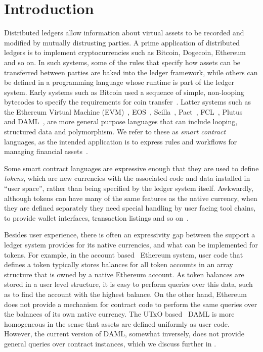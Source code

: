 
\section{Introduction}
Distributed ledgers allow information about virtual assets to be recorded and modified by mutually distrusting parties. A prime application of distributed ledgers is to implement cryptocurrencies such as Bitcoin, Dogecoin, Ethereum and so on. In such systems, some of the rules that specify how assets can be transferred between parties are baked into the ledger framework, while others can be defined in a programming language whose runtime is part of the ledger system. Early systems such as Bitcoin used a sequence of simple, non-looping bytecodes to specify the requirements for coin transfer~\cite{Atzei2017:BitcoinTransactions}. Latter systems such as the Ethereum Virtual Machine (EVM)~\cite{Wood2014:Ethereum}, EOS~\cite{Grigg2017:EosIntroduction}, Scilla~\cite{Sergey2018:Scilla}, Pact~\cite{Popejpy2016:Pact}, FCL~\cite{Adjoint2019:FCL}, Plutus~\cite{IOHK2018:Plutus} and DAML~\cite{DA2019:DAML}, are more general purpose languages that can include looping, structured data and polymorphism. We refer to these as \emph{smart contract} languages, as the intended application is to express rules and workflows for managing financial assets~\cite{Harz2018:SurveyLanguages}.

Some smart contract languages are expressive enough that they are used to define \emph{tokens}, which are new currencies with the associated code and data installed in ``user space'', rather than being specified by the ledger system itself. Awkwardly, although tokens can have many of the same features as the native currency, when they are defined separately they need special handling by user facing tool chains, to provide wallet interfaces, transaction listings and so on~\cite{Vogelsteller2015:ERC20}.

Besides user experience, there is often an expressivity gap between the support a ledger system provides for its native currencies, and what can be implemented for tokens. For example, in the account based~\cite{Zahnentferner2018:Chimeric} Ethereum system, user code that defines a token typically stores balances for all token accounts in an array structure that is owned by a native Ethereum account. As token balances are stored in a user level structure, it is easy to perform queries over this data, such as to find the account with the highest balance. On the other hand, Ethereum does not provide a mechanism for contract code to perform the same queries over the balances of its own native currency. The UTxO based~\cite{Zahnentferner2018:UTxO} DAML is more homogeneous in the sense that assets are defined uniformly as user code. However, the current version of DAML, somewhat inversely, does not provide general queries over contract instances, which we discuss further in \REF.

